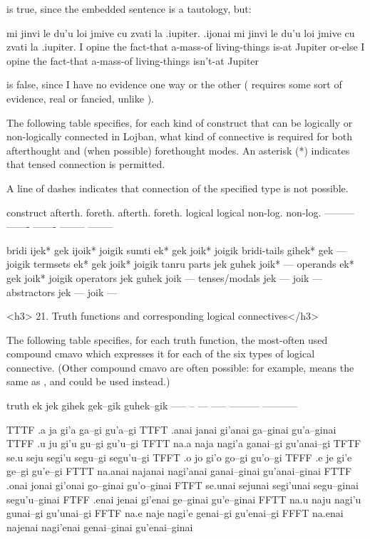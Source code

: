 {\noindent}is true, since the embedded sentence is a tautology, but:
\begin{example}
mi jinvi le du'u loi jmive\n
\T	cu zvati la .iupiter.\n
.ijonai mi jinvi le du'u loi jmive\n
\T	cu zvati la .iupiter.\n
I opine the fact-that a-mass-of living-things\n
\T	is-at Jupiter\n
or-else I opine the fact-that a-mass-of living-things\n
\T	isn't-at Jupiter
\end{example}

{\noindent}is false, since I have no evidence one way or the other
    ( requires some sort of evidence, real or fancied,
    unlike ).



The following table specifies, for each kind of construct
    that can be logically or non-logically connected in Lojban,
    what kind of connective is required for both afterthought and
    (when possible) forethought modes. An asterisk (*) indicates
    that tensed connection is permitted.

A line of dashes indicates that connection of the specified
    type is not possible.

   construct   afterth. foreth.  afterth.  foreth.
                    logical  logical  non-log.  non-log.
    ---------   -------  -------  --------  --------

bridi       ijek*    gek     ijoik*     joigik
    sumti       ek*      gek     joik*      joigik
    bridi-tails gihek*   gek     ---        joigik
    termsets    ek*      gek     joik*      joigik
    tanru parts jek      guhek   joik*      ---
    operands    ek*      gek     joik*      joigik
    operators   jek      guhek   joik       ---
    tenses/modals   jek      ---     joik       ---
    abstractors jek      ---     joik       ---

<h3>
21. Truth functions and corresponding logical
    connectives</h3>

The following table specifies, for each truth function, the
    most-often used compound cmavo which expresses it for each of
    the six types of logical connective. (Other compound cmavo are
    often possible: for example,  means the same as ,
    and could be used instead.)

truth  ek  jek gihek     gek--gik  guhek--gik
-----   --  --- -----     --------- -----------

TTTF    .a  ja  gi'a      ga--gi    gu'a--gi
TTFT    .anai   janai   gi'anai   ga--ginai gu'a--ginai
TTFF    .u  ju  gi'u      gu--gi    gu'u--gi
TFTT    na.a    naja    nagi'a    ganai--gi gu'anai--gi
TFTF    se.u    seju    segi'u    segu--gi  segu'u--gi
TFFT    .o  jo  gi'o      go--gi    gu'o--gi
TFFF    .e  je  gi'e      ge--gi    gu'e--gi
FTTT    na.anai najanai nagi'anai ganai--ginai  gu'anai--ginai
FTTF    .onai   jonai   gi'onai   go--ginai gu'o--ginai
FTFT    se.unai sejunai segi'unai segu--ginai   segu'u--ginai
FTFF    .enai   jenai   gi'enai   ge--ginai gu'e--ginai
FFTT    na.u    naju    nagi'u    gunai--gi gu'unai--gi
FFTF    na.e    naje    nagi'e    genai--gi gu'enai--gi
FFFT    na.enai najenai nagi'enai genai--ginai  gu'enai--ginai


